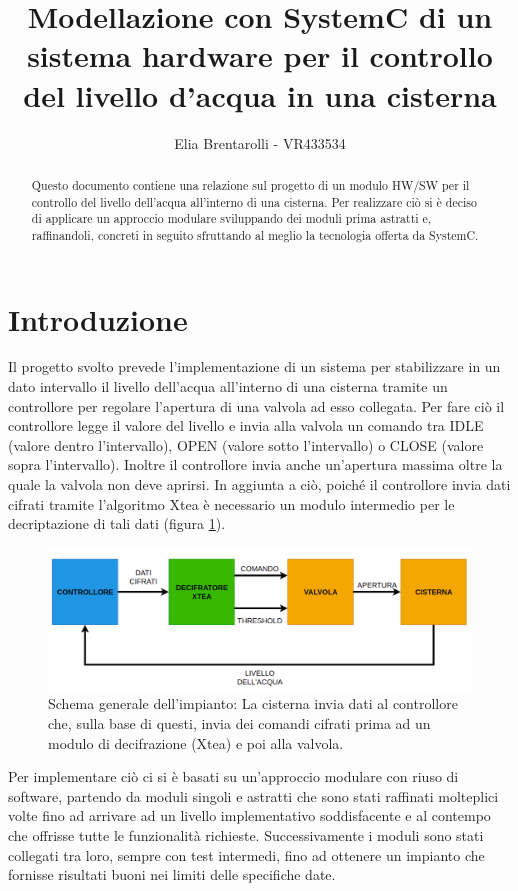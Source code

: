 \documentclass[]{IEEEtran}
\title{Modellazione con SystemC di un sistema hardware per il controllo del livello d'acqua in una cisterna}
\author{Elia Brentarolli - VR433534}
\begin{document}
\maketitle

\begin{abstract}
	
Questo documento contiene una relazione sul progetto di un modulo HW/SW per il controllo del livello dell'acqua all'interno di una cisterna. Per realizzare ciò si è deciso di applicare un approccio modulare sviluppando dei moduli prima astratti  e, raffinandoli, concreti in seguito sfruttando al meglio la tecnologia offerta da SystemC.

\end{abstract}


\section{Introduzione}
Il progetto svolto prevede l'implementazione di un sistema per stabilizzare in un dato intervallo il livello dell'acqua all'interno di una cisterna tramite un controllore per regolare l'apertura di una valvola ad esso collegata. Per fare ciò il controllore legge il valore del livello e invia alla valvola un comando tra IDLE (valore dentro l'intervallo), OPEN (valore sotto l'intervallo) o CLOSE (valore sopra l'intervallo). Inoltre il controllore invia anche un'apertura massima oltre la quale la valvola non deve aprirsi. In aggiunta a ciò, poiché il controllore invia dati cifrati tramite l'algoritmo  Xtea è necessario un modulo intermedio per le decriptazione di tali dati (figura \ref{scheme}).
\begin{figure}[ht]
	\centering
	\includegraphics[width=\textwidth]{Images/scheme.png}
	\caption{Schema generale dell'impianto: La cisterna invia dati al controllore che, sulla base di questi, invia dei comandi cifrati prima ad un modulo di decifrazione (Xtea) e poi alla valvola.}
	\label{scheme}
\end{figure}

Per implementare ciò ci si è basati su un'approccio modulare con riuso di software, partendo da moduli singoli e astratti che sono stati raffinati molteplici volte fino ad arrivare ad un livello implementativo soddisfacente e al contempo che offrisse tutte le funzionalità richieste. Successivamente i moduli sono stati collegati tra loro, sempre con test intermedi, fino ad ottenere un impianto che fornisse risultati buoni nei limiti delle specifiche date.
\end{document}
